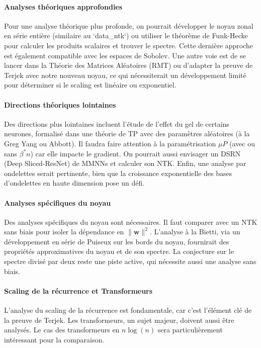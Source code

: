 \paragraph{Analyses théoriques approfondies}
Pour une analyse théorique plus profonde, on pourrait développer le noyau zonal en série entière (similaire au `data_ntk`) ou utiliser le théorème de Funk-Hecke pour calculer les produits scalaires et trouver le spectre. Cette dernière approche est également compatible avec les espaces de Sobolev. Une autre voie est de se lancer dans la Théorie des Matrices Aléatoires (RMT) ou d'adapter la preuve de Terjek avec notre nouveau noyau, ce qui nécessiterait un développement limité pour déterminer si le scaling est linéaire ou exponentiel.

\paragraph{Directions théoriques lointaines}
Des directions plus lointaines incluent l'étude de l'effet du gel de certains neurones, formalisé dans une théorie de TP avec des paramètres aléatoires (à la Greg Yang ou Abbott). Il faudra faire attention à la paramétrisation $\mu P$ (avec ou sans $\beta^*n$) car elle impacte le gradient. On pourrait aussi envisager un DSRN (Deep Sliced-ResNet) de MMNNs et calculer son NTK. Enfin, une analyse par ondelettes serait pertinente, bien que la croissance exponentielle des bases d'ondelettes en haute dimension pose un défi.

\paragraph{Analyses spécifiques du noyau}
Des analyses spécifiques du noyau sont nécessaires. Il faut comparer avec un NTK sans biais pour isoler la dépendance en $\|\bm{w}\|^2$. L'analyse à la Bietti, via un développement en série de Puiseux sur les bords du noyau, fournirait des propriétés approximatives du noyau et de son spectre. La conjecture sur le spectre divisé par deux reste une piste active, qui nécessite aussi une analyse sans biais.

\paragraph{Scaling de la récurrence et Transformeurs}
L'analyse du scaling de la récurrence est fondamentale, car c'est l'élément clé de la preuve de Terjek. Les transformeurs, un sujet majeur, doivent aussi être analysés. Le cas des transformeurs en $n\log(n)$ sera particulièrement intéressant pour la comparaison.

